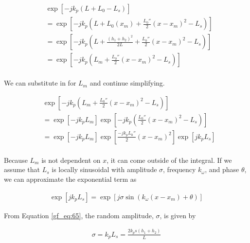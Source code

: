 \begin{equation}
\begin{aligned}
&\exp\left[-jk_p\left( L+L_0-L_s\right) \right]\\
&= \exp\left[-jk_p\left( L+L_0(x_m) + \frac{L_0''}{2}(x-x_m)^2-L_s\right) \right]\\
&= \exp\left[-jk_p\left( L+\frac{(h_1+h_2)^2}{2L} + \frac{L_0''}{2}(x-x_m)^2-L_s\right)\right]\\
&=\exp\left[-jk_p\left(L_m+\frac{L_0''}{2}(x-x_m)^2-L_s\right)\right]\\
\label{gf_eq:67}
\end{aligned}
\end{equation}
\renewcommand{\baselinestretch}{2} \small\normalsize

\noindent We can substitute in for $L_m$ and continue simplifying.

\begin{equation}
\begin{aligned}
&\exp\left[-jk_p\left(L_m+\frac{L_0''}{2}(x-x_m)^2-L_s\right)\right]\\
&=\exp\left[-jk_pL_m\right]\exp\left[-jk_p\left(\frac{L_0''}{2}(x-x_m)^2-L_s\right)\right]\\
&=\exp\left[-jk_pL_m\right]\exp\left[\frac{-jk_pL_0''}{2}(x-x_m)^2\right]\exp\left[jk_pL_s \right]\\
\label{gf_eq:67a}
\end{aligned}
\end{equation}
\renewcommand{\baselinestretch}{2} \small\normalsize

Because $L_m$ is not dependent on $x$, it can come outside of the integral. If we assume that $L_s$ is locally sinusoidal with amplitude $\sigma$, frequency $k_{\omega}$, and phase $\theta$, we can approximate the exponential term as 

\begin{equation}
\begin{aligned}
\exp\left[jk_pL_s\right] =\exp\left[j\sigma \sin\left(k_{\omega} (x-x_m) + \theta\right) \right]
\end{aligned}
\label{gf_eq:68}
\end{equation}
\renewcommand{\baselinestretch}{2} \small\normalsize

\noindent From Equation \ref{gf_eq:65}, the random amplitude, $\sigma$, is given by

\begin{equation}
\begin{aligned}
\sigma = k_pL_s = \frac{2k_ps(h_1+h_2)}{L}
\end{aligned}
\label{gf_eq:69}
\end{equation}
\renewcommand{\baselinestretch}{2} \small\normalsize

